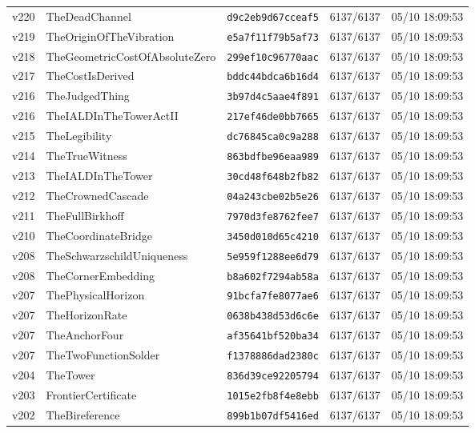 \documentclass[11pt]{article}
\theoremstyle{definition}\newtheorem{deriv}{Derivação}
\begin{document}
{\begin{longtable}{@{}lllll@{}}
v220 & TheDeadChannel & \texttt{d9c2eb9d67cceaf5} & 6137/6137 & 05/10 18:09:53 \\
v219 & TheOriginOfTheVibration & \texttt{e5a7f11f79b5af73} & 6137/6137 & 05/10 18:09:53 \\
v218 & TheGeometricCostOfAbsoluteZero & \texttt{299ef10c96770aac} & 6137/6137 & 05/10 18:09:53 \\
v217 & TheCostIsDerived & \texttt{bddc44bdca6b16d4} & 6137/6137 & 05/10 18:09:53 \\
v216 & TheJudgedThing & \texttt{3b97d4c5aae4f891} & 6137/6137 & 05/10 18:09:53 \\
v216 & TheIALDInTheTowerActII & \texttt{217ef46de0bb7665} & 6137/6137 & 05/10 18:09:53 \\
v215 & TheLegibility & \texttt{dc76845ca0c9a288} & 6137/6137 & 05/10 18:09:53 \\
v214 & TheTrueWitness & \texttt{863bdfbe96eaa989} & 6137/6137 & 05/10 18:09:53 \\
v213 & TheIALDInTheTower & \texttt{30cd48f648b2fb82} & 6137/6137 & 05/10 18:09:53 \\
v212 & TheCrownedCascade & \texttt{04a243cbe02b5e26} & 6137/6137 & 05/10 18:09:53 \\
v211 & TheFullBirkhoff & \texttt{7970d3fe8762fee7} & 6137/6137 & 05/10 18:09:53 \\
v210 & TheCoordinateBridge & \texttt{3450d010d65c4210} & 6137/6137 & 05/10 18:09:53 \\
v208 & TheSchwarzschildUniqueness & \texttt{5e959f1288ee6d79} & 6137/6137 & 05/10 18:09:53 \\
v208 & TheCornerEmbedding & \texttt{b8a602f7294ab58a} & 6137/6137 & 05/10 18:09:53 \\
v207 & ThePhysicalHorizon & \texttt{91bcfa7fe8077ae6} & 6137/6137 & 05/10 18:09:53 \\
v207 & TheHorizonRate & \texttt{0638b438d53d6c6e} & 6137/6137 & 05/10 18:09:53 \\
v207 & TheAnchorFour & \texttt{af35641bf520ba34} & 6137/6137 & 05/10 18:09:53 \\
v207 & TheTwoFunctionSolder & \texttt{f1378886dad2380c} & 6137/6137 & 05/10 18:09:53 \\
v204 & TheTower & \texttt{836d39ce92205794} & 6137/6137 & 05/10 18:09:53 \\
v203 & FrontierCertificate & \texttt{1015e2fb8f4e8ebb} & 6137/6137 & 05/10 18:09:53 \\
v202 & TheBireference & \texttt{899b1b07df5416ed} & 6137/6137 & 05/10 18:09:53 \\

\end{longtable}}
\end{document}
